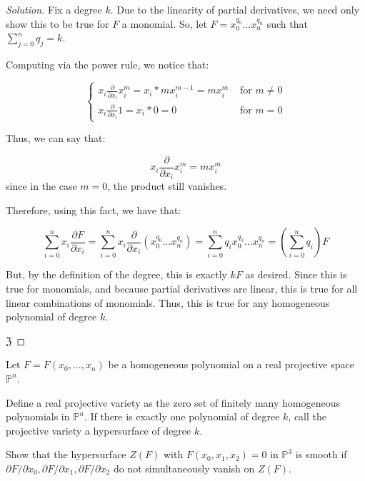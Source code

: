 \documentclass[10pt]{article}
\newenvironment{problem}[2][]{\begin{trivlist}
\item[\hskip \labelsep {\bfseries #1}\hskip \labelsep {\bfseries #2.}]}{\end{trivlist}}
\begin{document}
\begin{proof}[Solution]

Fix a degree $k$. Due to the linearity of partial derivatives, we need only show this to be true for $F$ a monomial. So, let $F = x_0^{q_0}...x_n^{q_n}$ such that $\sum_{j=0}^n q_j = k$.

Computing via the power rule, we notice that:

$$ \begin{cases} x_i \frac{\partial}{\partial x_i} x_i^m = x_i * m x_i^{m-1} = mx_i^m & \text{ for } m \not = 0 \\  x_i \frac{\partial}{\partial x_i} 1 = x_i * 0 = 0 & \text{ for }m = 0 \end{cases}$$

Thus, we can say that:

$$x_i \frac{\partial}{\partial x_i} x_i^m = mx_i^m$$ since in the case $m = 0$, the product still vanishes.

Therefore, using this fact, we have that:

$$  \sum_{i=0}^n x_i \frac{\partial F}{\partial x_i} =  \sum_{i=0}^n  x_i \frac{\partial}{\partial x_i}( x_0^{q_0}...x_n^{q_n}) = \sum_{i=0}^n q_i x_0^{q_0}...x_n^{q_n} = \left( \sum_{i=0}^n q_i \right) F$$

But, by the definition of the degree, this is exactly $kF$ as desired. Since this is true for monomials, and because partial derivatives are linear, this is true for all linear combinations of monomials. Thus, this is true for any homogeneous polynomial of degree $k$.
 
$\mathfrak{Z}$
\end{proof}

\begin{problem}{Question 3}

Let $F = F(x_0,...,x_n)$ be a homogeneous polynomial on a real projective space $\mathbb{P}^n$.

Define a real projective variety as the zero set of finitely many homogeneous polynomials in $\mathbb{P}^n$. If there is exactly one polynomial of degree $k$, call the projective variety a hypersurface of degree $k$.

Show that the hypersurface $Z(F)$ with $F(x_0,x_1,x_2) = 0$  in $\mathbb{P}^3$ is smooth if $\partial F/ \partial x_0, \partial F/ \partial x_1, \partial F/ \partial x_2$ do not simultaneously vanish on $Z(F)$.

\end{problem}
\end{document}
